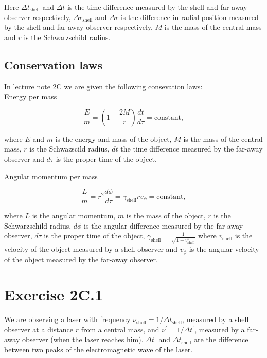 \documentclass[a4paper,10pt,english]{article}
\begin{document}
Here $\Delta t_{\text{shell}}$ and $\Delta t$ is the time difference measured by the shell and far-away observer respectively, $\Delta r_{\text{shell}}$ and $\Delta r$ is the difference in radial position measured by the shell and far-away observer respectively, $M$ is the mass of the central mass and $r$ is the Schwarzschild radius.

\subsection*{Conservation laws}
In lecture note 2C we are given the following consevation laws:
\\
Energy per mass

\begin{equation}\label{eq:E/m}
\frac{E}{m}=\left(1-\frac{2M}{r}\right)\frac{dt}{d\tau}=\text{constant},
\end{equation}

where $E$ and $m$ is the energy and mass of the object, $M$ is the mass of the central mass, $r$ is the Schwazscild radius, $dt$ the time difference measured by the far-away observer and $d\tau$ is the proper time of the object.

Angular momentum per mass

\begin{equation}\label{eq:L/m}
\frac{L}{m}=r^{2}\frac{d\phi}{d\tau}=\gamma_{\text{shell}}rv_{\phi}=\text{constant},
\end{equation}

where $L$ is the angular momentum, $m$ is the mass of the object, $r$ is the Schwarzschild radius, $d\phi$ is the angular difference measured by the far-away observer, $d\tau$ is the proper time of the object, $\gamma_{\text{shell}}=\frac{1}{\sqrt{1-v_{\text{shell}}^{2}}}$ where $v_{\text{shell}}$ is the velocity of the object measured by a shell observer and $v_{\phi}$ is the angular velocity of the object measured by the far-away observer.

\newpage








\section*{Exercise 2C.1}


We are observing a laser with frequency $\nu_{\text{shell}}=1/\Delta t_\text{shell}$, measured by a shell observer at a distance $r$ from a central mass, and $\nu^{\prime}=1/\Delta t^{\prime}$, measured by a far-away observer (when the laser reaches him). $\Delta t^{\prime}$ and $\Delta t_\text{shell}$ are the difference between two peaks of the electromagnetic wave of the laser.
\end{document}

